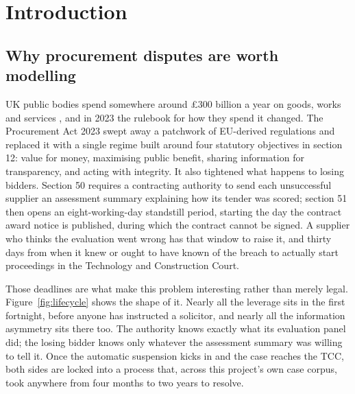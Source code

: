 \chapter{Introduction}
\label{ch:intro}

\section{Why procurement disputes are worth modelling}
\label{sec:context}

UK public bodies spend somewhere around \pounds300 billion a year on goods, works
and services \cite{cabinetoffice2020}, and in 2023 the rulebook for how they spend
it changed. The Procurement Act 2023 \cite{pa2023} swept away a patchwork of
EU-derived regulations and replaced it with a single regime built around four
statutory objectives in section 12: value for money, maximising public benefit,
sharing information for transparency, and acting with integrity. It also
tightened what happens to losing bidders. Section 50 requires a contracting
authority to send each unsuccessful supplier an assessment summary explaining how
its tender was scored; section 51 then opens an eight-working-day standstill
period, starting the day the contract award notice is published, during which the
contract cannot be signed. A supplier who thinks the evaluation went wrong has
that window to raise it, and thirty days from when it knew or ought to have known
of the breach to actually start proceedings in the Technology and Construction
Court.

Those deadlines are what make this problem interesting rather than merely legal.
Figure~\ref{fig:lifecycle} shows the shape of it. Nearly all the leverage sits in
the first fortnight, before anyone has instructed a solicitor, and nearly all the
information asymmetry sits there too. The authority knows exactly what its
evaluation panel did; the losing bidder knows only whatever the assessment
summary was willing to tell it. Once the automatic suspension kicks in and the
case reaches the TCC, both sides are locked into a process that, across this
project's own case corpus, took anywhere from four months to two years to
resolve.

